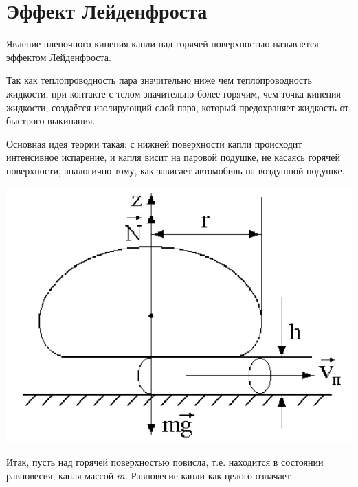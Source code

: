 \documentclass[a4paper,12pt]{article} %
\begin{document}
\section{Эффект Лейденфроста}

\noindent Явление пленочного кипения капли над горячей поверхностью называется эффектом Лейденфроста. 

\medskip

\noindent Так как теплопроводность пара значительно ниже чем теплопроводность жидкости, при контакте с телом значительно более горячим, чем точка кипения жидкости, создаётся изолирующий слой пара, который предохраняет жидкость от быстрого выкипания.

\medskip

\noindent Основная идея теории такая: с нижней поверхности капли происходит интенсивное испарение, и капля висит на паровой подушке, не касаясь горячей поверхности, аналогично тому, как зависает автомобиль на воздушной подушке. 

\medskip
\begin{center}

\begin{minipage}{.50\textwidth}
  \centering
  \includegraphics[scale={0.6}]{силы.jpg}
\end{minipage}

\end{center}

\medskip

\noindent Итак, пусть над горячей поверхностью повисла, т.е. находится в состоянии равновесия, капля массой $m$. Равновесие капли как целого означает 
\end{document}
